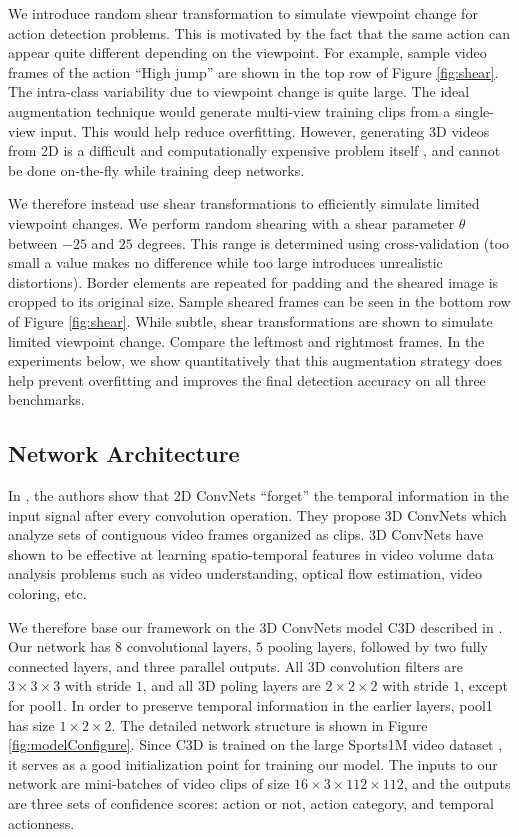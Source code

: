 \documentclass[10pt,twocolumn,letterpaper]{article}
\begin{document}
We introduce random shear transformation to simulate viewpoint change for action detection problems. This is motivated by the fact that the same action can appear quite different depending on the viewpoint. For example, sample video frames of the action ``High jump'' are shown in the top row of Figure \ref{fig:shear}. The intra-class variability due to viewpoint change is quite large. The ideal augmentation technique would generate multi-view training clips from a single-view input. This would help reduce overfitting. However, generating 3D videos from 2D is a difficult and computationally expensive problem itself \cite{2dto3d_pose_eccv12_rama,DeepStereo2015,3d_shapenet_cvpr15_wu}, and cannot be done on-the-fly while training deep networks. 

We therefore instead use shear transformations to efficiently simulate limited viewpoint changes. We perform random shearing with a shear parameter $\theta$ between $-25$ and $25$ degrees. This range is determined using cross-validation (too small a value makes no difference while too large introduces unrealistic distortions). Border elements are repeated for padding and the sheared image is cropped to its original size. Sample sheared frames can be seen in the bottom row of Figure \ref{fig:shear}. While subtle, shear transformations are shown to simulate limited viewpoint change. Compare the leftmost and rightmost frames. In the experiments below, we show quantitatively that this augmentation strategy does help prevent overfitting and improves the final detection accuracy on all three benchmarks.

\subsection{Network Architecture}
\label{sec:architecture}
In \cite{c3d2015}, the authors show that 2D ConvNets ``forget'' the temporal information in the input signal after every convolution operation. They propose 3D ConvNets which analyze sets of contiguous video frames organized as clips. 3D ConvNets have shown to be effective at learning spatio-temporal features in video volume data analysis problems \cite{vox2vox_cvprw16_dutran} such as video understanding, optical flow estimation, video coloring, etc.

We therefore base our framework on the 3D ConvNets model C3D described in \cite{c3d2015}. Our network has $8$ convolutional layers, $5$ pooling layers, followed by two fully connected layers, and three parallel outputs. All 3D convolution filters are $3 \times 3 \times 3$ with stride $1$, and all 3D poling layers are $2 \times 2 \times 2$ with stride $1$, except for \textsf{pool1}. In order to preserve temporal information in the earlier layers, \textsf{pool1} has size $1 \times 2 \times 2$. The detailed network structure is shown in Figure \ref{fig:modelConfigure}. 
Since C3D is trained on the large Sports1M video dataset \cite{KarpathyCVPR14}, it serves as a good initialization point for training our model. The inputs to our network are mini-batches of video clips of size $16 \times 3 \times 112 \times 112$, and the outputs are three sets of confidence scores: action or not, action category, and temporal actionness.
\end{document}
